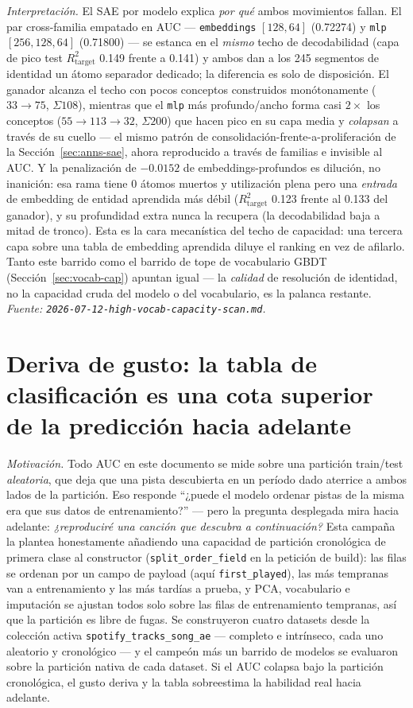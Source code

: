 \documentclass[11pt]{article}
\begin{document}
\emph{Interpretación.} El SAE por modelo explica \emph{por qué} ambos movimientos
fallan. El par cross-familia empatado en AUC --- \texttt{embeddings} $[128,64]$
(\num{0.72274}) y \texttt{mlp} $[256,128,64]$ (\num{0.71800}) --- se estanca en el
\emph{mismo} techo de decodabilidad (capa de pico test $R^2_{\text{target}}$
\num{0.149} frente a \num{0.141}) y ambos dan a los 245 segmentos de identidad un
átomo separador dedicado; la diferencia es solo de disposición. El ganador alcanza
el techo con pocos conceptos construidos monótonamente ($33\to75$, $\Sigma108$),
mientras que el \texttt{mlp} más profundo/ancho forma casi $2\times$ los conceptos
($55\to113\to32$, $\Sigma200$) que hacen pico en su capa media y \emph{colapsan} a
través de su cuello --- el mismo patrón de consolidación-frente-a-proliferación de
la Sección~\ref{sec:anns-sae}, ahora reproducido a través de familias e invisible
al AUC. Y la penalización de $-\num{0.0152}$ de embeddings-profundos es dilución,
no inanición: esa rama tiene 0 átomos muertos y utilización plena pero una
\emph{entrada} de embedding de entidad aprendida más débil ($R^2_{\text{target}}$
\num{0.123} frente al \num{0.133} del ganador), y su profundidad extra nunca la
recupera (la decodabilidad baja a mitad de tronco). Esta es la cara mecanística del
techo de capacidad: una tercera capa sobre una tabla de embedding aprendida diluye
el ranking en vez de afilarlo. Tanto este barrido como el barrido de tope de
vocabulario GBDT (Sección~\ref{sec:vocab-cap}) apuntan igual --- la \emph{calidad}
de resolución de identidad, no la capacidad cruda del modelo o del vocabulario, es
la palanca restante. \emph{Fuente:
\texttt{2026-07-12-high-vocab-capacity-scan.md}.}

\section{Deriva de gusto: la tabla de clasificación es una cota superior de la predicción hacia adelante}
\label{sec:drift}
\emph{Motivación.} Todo AUC en este documento se mide sobre una partición
train/test \emph{aleatoria}, que deja que una pista descubierta en un período dado
aterrice a ambos lados de la partición. Eso responde ``¿puede el modelo ordenar
pistas de la misma era que sus datos de entrenamiento?'' --- pero la pregunta
desplegada mira hacia adelante: \emph{¿reproduciré una canción que descubra a
continuación?} Esta campaña la plantea honestamente añadiendo una capacidad de
partición cronológica de primera clase al constructor (\texttt{split\_order\_field}
en la petición de build): las filas se ordenan por un campo de payload (aquí
\texttt{first\_played}), las más tempranas van a entrenamiento y las más tardías a
prueba, y PCA, vocabulario e imputación se ajustan todos solo sobre las filas de
entrenamiento tempranas, así que la partición es libre de fugas. Se construyeron
cuatro datasets desde la colección activa \texttt{spotify\_tracks\_song\_ae} ---
completo e intrínseco, cada uno aleatorio y cronológico --- y el campeón más un
barrido de modelos se evaluaron sobre la partición nativa de cada dataset. Si el
AUC colapsa bajo la partición cronológica, el gusto deriva y la tabla sobreestima
la habilidad real hacia adelante.
\end{document}
